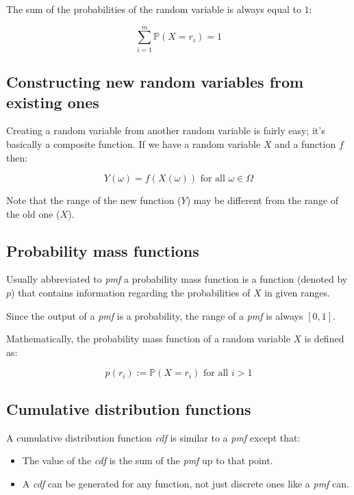 The sum of the probabilities of the random variable is always equal to $1$:

\begin{dmath*}
	\sum\limits_{i=1}^m\mathbb{P}(X=r_i) = 1
\end{dmath*}

\subsection{Constructing new random variables from existing ones}
\label{subsec:new_random_vars}
Creating a random variable from another random variable is fairly easy; it's
basically a composite function. If we have a random variable $X$ and a function
$f$ then:

\begin{dmath*}
	Y(\omega) = f(X(\omega)) \textrm{ for all $\omega \in \Omega$}
\end{dmath*}

Note that the range of the new function ($Y$) may be different from the range of
the old one ($X$).

\subsection{Probability mass functions}

Usually abbreviated to {\it pmf} a probability mass function is a function
(denoted by $p$) that contains information regarding the probabilities of $X$ in
given ranges.

Since the output of a {\it pmf} is a probability, the range of a {\it pmf} is
always $[0,1]$.

Mathematically, the probability mass function of a random variable $X$ is
defined as:

\begin{dmath*}
	p(r_i) := \mathbb{P}(X = r_i) \textrm{ for all $i > 1$}
\end{dmath*}


\subsection{Cumulative distribution functions}

A cumulative distribution function {\it cdf} is similar to a {\it pmf} except
that:

\begin{itemize}
	\item The value of the {\it cdf} is the sum of the {\it pmf} up to that 
	point.
	\item A {\it cdf} can be generated for any function, not just discrete ones
	like a {\it pmf} can.
\end{itemize}

